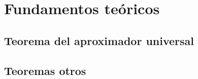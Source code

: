 \chapter{Fundamentos teóricos}\label{ch:FundamentosTeoricos}

\section{Teorema del aproximador universal}

\section{Teoremas otros}